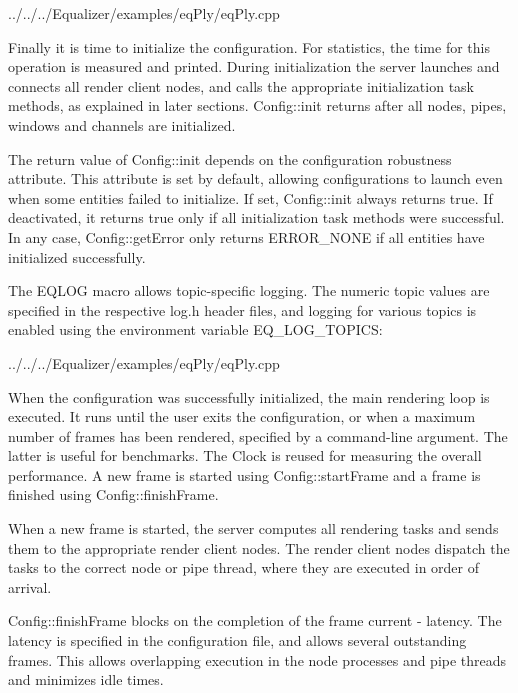 \documentclass[10pt,a4]{scrartcl}
\begin{document}
{\footnotesize
  {../../../Equalizer/examples/eqPly/eqPly.cpp}}

Finally it is time to initialize the configuration. For statistics, the
time for this operation is measured and printed. During initialization
the server launches and connects all render client nodes, and calls the
appropriate initialization task methods, as explained in later
sections. \textsf{Config::init} returns after all nodes, pipes,
windows and channels are initialized.

The return value of \textsf{Config::init} depends on the configuration
robustness attribute. This attribute is set by default, allowing configurations
to launch even when some entities failed to initialize. If set,
\textsf{Config::init} always returns true. If deactivated, it returns
\textsf{true} only if all initialization task methods were successful. In any
case, \textsf{Config::getError} only returns \textsf{ERROR\_NONE} if all
entities have initialized successfully.

The \textsf{EQLOG} macro allows topic-specific logging. The numeric
topic values are specified in the respective \textsf{log.h} header
files, and logging for various topics is enabled using the environment
variable \textsf{EQ\_LOG\_TOPICS}:

{\footnotesize
  {../../../Equalizer/examples/eqPly/eqPly.cpp}}

When the configuration was successfully initialized, the main rendering
loop is executed. It runs until the user exits the
configuration, or when a maximum number of frames has been rendered,
specified by a command-line argument. The latter is useful for
benchmarks. The \textsf{Clock} is reused for measuring the overall
performance. A new frame is started using \textsf{Config::startFrame}
and a frame is finished using \textsf{Config::finishFrame}.

When a new frame is started, the server computes all rendering tasks and
sends them to the appropriate render client nodes. The render client
nodes dispatch the tasks to the correct node or pipe thread, where they
are executed in order of arrival.

\textsf{Config::finishFrame} blocks on the completion of the frame
\textsf{current - latency}. The latency is specified in the
configuration file, and allows several outstanding frames. This allows
overlapping execution in the node processes and pipe threads and
minimizes idle times.
\end{document}
